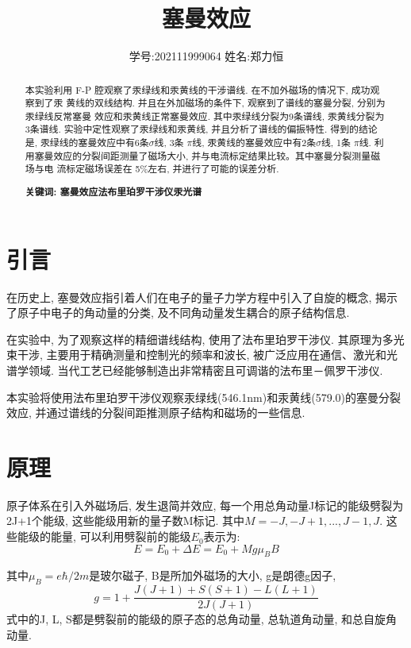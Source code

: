 \documentclass[12pt,a4paper]{article}
\title{\vspace{-4cm}\Large 塞曼效应}  %
\author{\kaishu 学号:202111999064 \hspace{2cm} 姓名:郑力恒}   %
\date{}
\begin{document}
\maketitle

\begin{abstract}
    本实验利用 F-P 腔观察了汞绿线和汞黄线的干涉谱线. 在不加外磁场的情况下, 成功观察到了汞
黄线的双线结构. 
并且在外加磁场的条件下, 观察到了谱线的塞曼分裂, 分别为汞绿线反常塞曼
效应和汞黄线正常塞曼效应. 其中汞绿线分裂为9条谱线, 汞黄线分裂为3条谱线. 
实验中定性观察了汞绿线和汞黄线, 并且分析了谱线的偏振特性. 得到的结论是, 汞绿线的塞曼效应中有6条$\sigma$线, 3条
$\pi$线, 汞黄线的塞曼效应中有2条$\sigma$线, 1条
$\pi$线. 利用塞曼效应的分裂间距测量了磁场大小, 并与电流标定结果比较。其中塞曼分裂测量磁场与电
流标定磁场误差在 5\%左右, 并进行了可能的误差分析. 


\bf{关键词: 塞曼效应\quad 法布里珀罗干涉仪\quad 汞光谱}
\end{abstract}

\section{引言}

在历史上, 塞曼效应指引着人们在电子的量子力学方程中引入了自旋的概念, 揭示了原子中电子的角动量的分类, 及不同角动量发生耦合的原子结构信息. 

在实验中, 为了观察这样的精细谱线结构, 使用了法布里珀罗干涉仪. 其原理为多光束干涉, 主要用于精确测量和控制光的频率和波长, 被广泛应用在通信、激光和光谱学领域. 
当代工艺已经能够制造出非常精密且可调谐的法布里－佩罗干涉仪. 

本实验将使用法布里珀罗干涉仪观察汞绿线(546.1nm)和汞黄线(579.0)的塞曼分裂效应, 并通过谱线的分裂间距推测原子结构和磁场的一些信息. 


\section{原理}
原子体系在引入外磁场后, 发生退简并效应, 每一个用总角动量J标记的能级劈裂为2J+1个能级, 这些能级用新的量子数M标记. 其中$M=-J,-J+1,...,J-1,J$. 
这些能级的能量, 可以利用劈裂前的能级$E_{0}$表示为: 
\begin{equation}
E=E_{0}+\Delta E=E_{0}+M g \mu_{B} B
\end{equation}

其中$\mu_B=e \hbar /2m$是玻尔磁子, B是所加外磁场的大小, g是朗德g因子, 
\begin{equation}
g=1+\frac{J(J+1)+S(S+1)-L(L+1)}{2J(J+1)}
\end{equation}
式中的J, L, S都是劈裂前的能级的原子态的总角动量, 总轨道角动量, 和总自旋角动量. 
\end{document}
